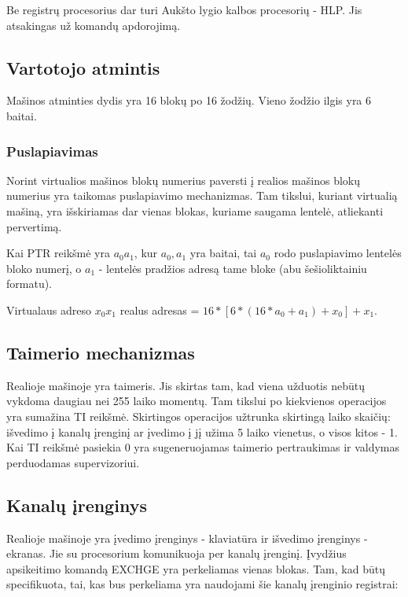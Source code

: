 \documentclass{VUMIFInfKursinis}
\begin{document}
Be registrų procesorius dar turi Aukšto lygio kalbos procesorių - HLP. Jis atsakingas už komandų apdorojimą.

\subsection{Vartotojo atmintis}

Mašinos atminties dydis yra 16 blokų po 16 žodžių. Vieno žodžio ilgis yra 6 baitai.

\subsubsection{Puslapiavimas}

Norint virtualios mašinos blokų numerius paversti į realios mašinos blokų numerius yra taikomas puslapiavimo mechanizmas. Tam tikslui, kuriant virtualią mašiną, yra išskiriamas dar vienas blokas, kuriame saugama lentelė, atliekanti pervertimą.

Kai PTR reikšmė yra $a_0a_1$, kur $a_0, a_1$ yra baitai, tai $a_0$ rodo puslapiavimo lentelės bloko numerį, o $a_1$ - lentelės pradžios adresą tame bloke (abu šešioliktainiu formatu).

Virtualaus adreso $x_0x_1$ realus adresas = $16 * [6 * (16 * a_0 + a_1) + x_0] + x_1$.

\subsection{Taimerio mechanizmas}
Realioje mašinoje yra taimeris. Jis skirtas tam, kad viena užduotis nebūtų vykdoma daugiau nei 255 laiko momentų. Tam tikslui po kiekvienos operacijos yra sumažina TI reikšmė. Skirtingos operacijos užtrunka skirtingą laiko skaičių: išvedimo į kanalų įrenginį ar įvedimo į jį užima 5 laiko vienetus, o visos kitos - 1. Kai TI reikšmė pasiekia 0 yra sugeneruojamas taimerio pertraukimas ir valdymas perduodamas supervizoriui.

\subsection{Kanalų įrenginys}

Realioje mašinoje yra įvedimo įrenginys - klaviatūra ir išvedimo įrenginys - ekranas. Jie su procesorium komunikuoja per kanalų įrenginį. Įvydžius apsikeitimo komandą EXCHGE yra perkeliamas vienas blokas. Tam, kad būtų specifikuota, tai, kas bus perkeliama yra naudojami šie kanalų įrenginio registrai:
\end{document}
